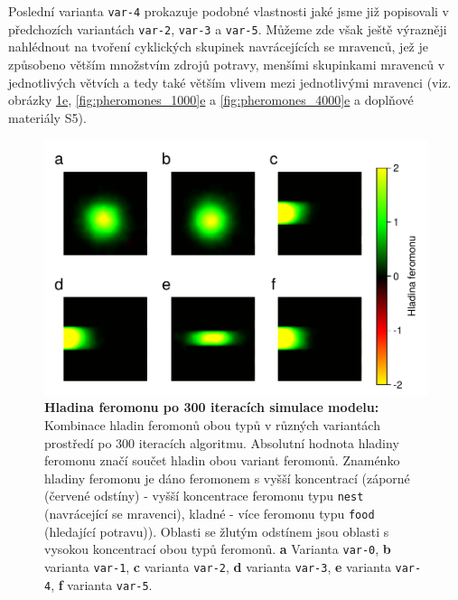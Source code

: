 \documentclass[10pt,a4paper,twocolumn]{article}
\begin{document}
Poslední varianta \texttt{var-4} prokazuje podobné vlastnosti 
jaké jsme již popisovali v předchozích variantách 
\texttt{var-2}, \texttt{var-3} a \texttt{var-5}. Můžeme zde však ještě 
výrazněji nahlédnout na tvoření cyklických skupinek navrácejících
se mravenců, jež je způsobeno větším množstvím zdrojů potravy, menšími skupinkami
mravenců v jednotlivých větvích a tedy také větším vlivem mezi 
jednotlivými mravenci (viz. obrázky 
\hyperref[fig:pheromones_300]{\ref*{fig:pheromones_300}e}, 
\hyperref[fig:pheromones_1000]{\ref*{fig:pheromones_1000}e} a 
\hyperref[fig:pheromones_4000]{\ref*{fig:pheromones_4000}e}
a doplňové materiály S5).


\begin{figure}[tb]
  \centering
  \includegraphics[width=0.98\linewidth]{images/pheromone_levels_300.pdf}
  \caption{\textbf{Hladina feromonu po 300 iteracích simulace modelu:} 
  Kombinace hladin feromonů obou typů v různých variantách prostředí 
  po 300 iteracích algoritmu. 
  Absolutní hodnota hladiny feromonu značí součet hladin obou variant
  feromonů. Znaménko hladiny feromonu je dáno
  feromonem s vyšší koncentrací (záporné (červené odstíny) - vyšší 
  koncentrace feromonu typu \texttt{nest} (navrácející se mravenci), 
  kladné - více feromonu typu \texttt{food} (hledající potravu)). 
  Oblasti se žlutým odstínem jsou oblasti s vysokou 
  koncentrací obou typů feromonů.
  \textbf{a} Varianta \texttt{var-0}, 
  \textbf{b} varianta \texttt{var-1},
  \textbf{c} varianta \texttt{var-2},
  \textbf{d} varianta \texttt{var-3},
  \textbf{e} varianta \texttt{var-4},
  \textbf{f} varianta \texttt{var-5}.}
  \label{fig:pheromones_300}
\end{figure}
\end{document}

